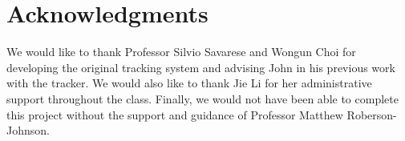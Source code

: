 \section{Acknowledgments}
\label{sec:ack}

We would like to thank Professor Silvio Savarese and Wongun Choi for developing the original tracking system and advising
John in his previous work with the tracker. We would also like to thank Jie Li for her administrative support throughout the class.
Finally, we would not have been able to complete this project without the support and guidance of Professor Matthew
Roberson-Johnson.